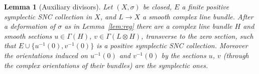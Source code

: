 \documentclass[11pt]{article}
\newtheorem{lemma}[theorem]{Lemma}
\theoremstyle{remark}
\begin{document}
\begin{lemma}[Auxiliary divisors]\label{lem:aux}
Let $(X,\sigma)$ be closed, $E$ a finite positive symplectic SNC
collection in $X$, and $L\to X$ a smooth complex line bundle. After a
deformation of $\sigma$ as in Lemma~\ref{lem:reg} there are a complex
line bundle $H$ and smooth sections $u\in\Gamma(H)$,
$v\in\Gamma(L\otimes H)$, transverse to the zero section, such that
$E\cup\{u^{-1}(0),v^{-1}(0)\}$
is a positive symplectic SNC collection. Moreover the orientations
induced on $u^{-1}(0)$ and $v^{-1}(0)$ by the sections $u$, $v$ (through
the complex orientations of their bundles) are the symplectic ones.
\end{lemma}

\end{document}
